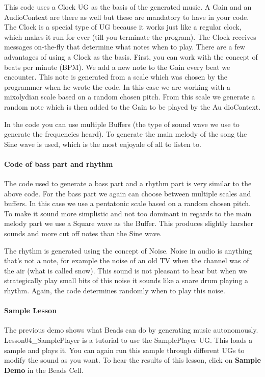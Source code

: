 \documentclass[12pt]{article}
\begin{document}
This code uses a Clock UG as the basis of the generated music. A Gain and an AudioContext are there as well but these are mandatory to have in your code. The Clock is a special type of UG because it works just like a regular clock, which makes it run for ever (till you terminate the program). The Clock receives messages on-the-fly that determine what notes when to play. There are a few advantages of using a Clock as the basis. First, you can work with the concept of beats per minute (BPM). We add a new note to the Gain every beat we encounter. This note is generated from a scale which was chosen by the programmer when he wrote the code. In this case we are working with a mixolydian scale based on a random chosen pitch. From this scale we generate a random note which is then added to the Gain to be played by the Au	dioContext.

In the code you can use multiple Buffers (the type of sound wave we use to generate the frequencies heard). To generate the main melody of the song the Sine wave is used, which is the most enjoyale of all to listen to.

\paragraph{Code of bass part and rhythm} 

The code used to generate a bass part and a rhythm part is very similar to the above code. For the bass part we again can choose between multiple scales and buffers. In this case we use a pentatonic scale based on a random chosen pitch. To make it sound more simplistic and not too dominant in regards to the main melody part we use a Square wave as the Buffer. This produces slightly harsher sounds and more cut off notes than the Sine wave.

The rhythm is generated using the concept of Noise. Noise in audio is anything that's not a note, for example the noise of an old TV when the channel was of the air (what is called snow). This sound is not pleasant to hear but when we strategically play small bits of this noise it sounds like a snare drum playing a rhythm. Again, the code determines randomly when to play this noise. 

\paragraph{Sample Lesson}

The previous demo shows what Beads can do by generating music autonomously. Lesson04\_SamplePlayer is a tutorial to use the SamplePlayer UG. This loads a sample and plays it. You can again run this sample through different UGs to modify the sound as you want. To hear the results of this lesson, click on \textbf{Sample Demo} in the Beads Cell. 
\end{document}
